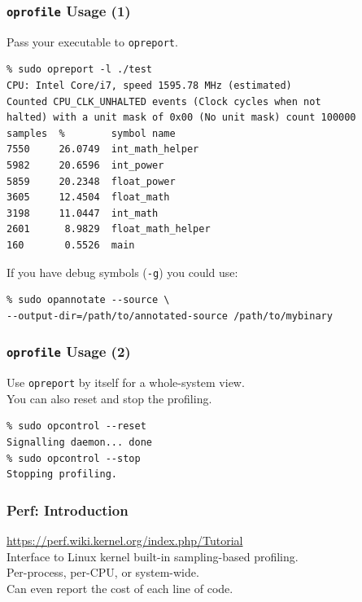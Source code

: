 \begin{frame}[fragile]
  \frametitle{{\tt oprofile} Usage (1)}
  

  Pass your executable to {\tt opreport}.

  \begin{lstlisting}
% sudo opreport -l ./test    
CPU: Intel Core/i7, speed 1595.78 MHz (estimated)
Counted CPU_CLK_UNHALTED events (Clock cycles when not
halted) with a unit mask of 0x00 (No unit mask) count 100000
samples  %        symbol name
7550     26.0749  int_math_helper
5982     20.6596  int_power
5859     20.2348  float_power
3605     12.4504  float_math
3198     11.0447  int_math
2601      8.9829  float_math_helper
160       0.5526  main
  \end{lstlisting}
  
    If you have debug symbols ({\tt -g}) you could use:

  \begin{lstlisting}
% sudo opannotate --source \
--output-dir=/path/to/annotated-source /path/to/mybinary
  \end{lstlisting}

\end{frame}

\begin{frame}[fragile]
  \frametitle{{\tt oprofile} Usage (2)}
  

    Use {\tt opreport} by itself for a whole-system view.\\
    You can also reset and stop the profiling.

  \begin{lstlisting}
% sudo opcontrol --reset 
Signalling daemon... done
% sudo opcontrol --stop
Stopping profiling.
  \end{lstlisting}

\end{frame}

\begin{frame}
  \frametitle{Perf: Introduction}


    \url{https://perf.wiki.kernel.org/index.php/Tutorial}\\[1em]

    Interface to Linux kernel built-in sampling-based profiling.\\
    Per-process, per-CPU, or system-wide.\\
    Can even report the cost of each line of code.

\end{frame}

